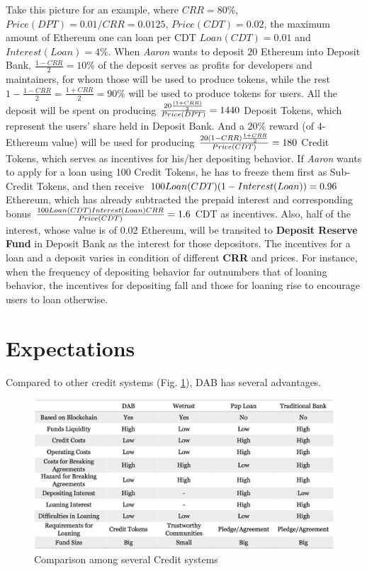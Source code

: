 \documentclass[review]{elsarticle}
\begin{document}
Take this picture for an example, where ${CRR = 80\%}$, ${Price(DPT) = 0.01/CRR = 0.0125}$, ${Price(CDT) = 0.02}$, the maximum amount of Ethereum one can loan per CDT ${Loan(CDT) = 0.01}$ and ${Interest(Loan) = 4\%}$. When \emph{Aaron} wants to deposit $20$ Ethereum into Deposit Bank, ${\frac{1 - CRR}{2} = 10\%}$ of the deposit serves as profits for developers and maintainers, for whom those will be used to produce tokens, while the rest ${1 - \frac{1 - CRR}{2} = \frac{1 + CRR}{2} = 90\%}$ will be used to produce tokens for users. All the deposit will be spent on producing ${\frac{20 \* \frac{(1 + CRR)}{2}}{Price(DPT)} = 1440}$ Deposit Tokens, which represent the users' share held in Deposit Bank. And a $20\%$ reward (of $4$-Ethereum value) will be used for producing ${\frac{20 \* (1 - CRR) \* \frac{1 + CRR}{2}}{Price(CDT)} = 180}$ Credit Tokens, which serves as incentives for his/her depositing behavior. If \emph{Aaron} wants to apply for a loan using 100 Credit Tokens, he has to freeze them first as Sub-Credit Tokens, and then receive ${100 \* Loan(CDT) \* (1 - Interest(Loan)) = 0.96}$ Ethereum, which has already subtracted the prepaid interest and corresponding bonus ${\frac{100 \* Loan(CDT) \* Interest(Loan) \* CRR}{Price(CDT)} = 1.6}$ CDT as incentives. Also, half of the interest, whose value is of 0.02 Ethereum, will be transited to \textbf{Deposit Reserve Fund} in Deposit Bank as the interest for those depositors.
The incentives for a loan and a deposit varies in condition of different \textbf{CRR} and prices. For instance, when the frequency of depositing behavior far outnumbers that of loaning behavior, the incentives for depositing fall and those for loaning rise to encourage users to loan otherwise.

\section{Expectations}

Compared to other credit systems (Fig. \ref{CC}), DAB has several advantages.

\begin{figure}[H]
\begin{center}
\includegraphics[width=4.5in]{Graphs/DWDT}
\end{center}
\caption{Comparison among several Credit systems}\label{CC}
\end{figure}
\end{document}
